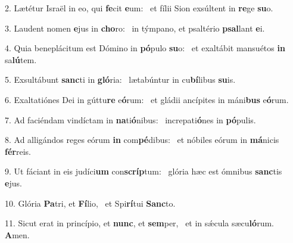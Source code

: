 2. Lætétur Israël in eo, qui \textbf{fe}cit \textbf{e}um: \ast\  et fílii Sion exsúltent in \textbf{re}ge \textbf{su}o.\

3. Laudent nomen \textbf{e}jus in \textbf{cho}ro: \ast\  in týmpano, et psaltério \textbf{psal}lant \textbf{e}i.\

4. Quia beneplácitum est Dómino in \textbf{pó}pulo \textbf{su}o: \ast\  et exaltábit mansuétos \textbf{in} sa\textbf{lú}tem.\

5. Exsultábunt \textbf{sanc}ti in \textbf{gló}ria: \ast\  lætabúntur in cu\textbf{bí}libus \textbf{su}is.\

6. Exaltatiónes Dei in gúttu\textbf{re} e\textbf{ó}rum: \ast\  et gládii ancípites in máni\textbf{bus} e\textbf{ó}rum.\

7. Ad faciéndam vindíctam in \textbf{na}ti\textbf{ó}nibus: \ast\  increpati\textbf{ó}nes in \textbf{pó}pulis.\

8. Ad alligándos reges eórum \textbf{in} com\textbf{pé}dibus: \ast\  et nóbiles eórum in \textbf{má}nicis \textbf{fér}reis.\

9. Ut fáciant in eis judíci\textbf{um} con\textbf{scríp}tum: \ast\  glória hæc est ómnibus \textbf{sanc}tis \textbf{e}jus.\

10. Glória \textbf{Pa}tri, et \textbf{Fí}lio, \ast\  et Spi\textbf{rí}tui \textbf{Sanc}to.\

11. Sicut erat in princípio, et \textbf{nunc}, et \textbf{sem}per, \ast\  et in sǽcula sæcu\textbf{ló}rum. \textbf{A}men.\

